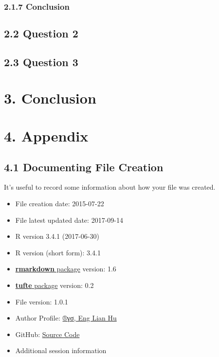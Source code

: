 \documentclass[]{tufte-book}
\providecommand{\tightlist}{%
  \setlength{\itemsep}{0pt}\setlength{\parskip}{0pt}}
\begin{document}
\subsection{2.1.7 Conclusion}\label{conclusion}

\section{2.2 Question 2}\label{question-2}

\section{2.3 Question 3}\label{question-3}

\chapter{3. Conclusion}\label{conclusion-1}

\chapter{4. Appendix}\label{appendix}

\section{4.1 Documenting File Creation}\label{documenting-file-creation}

It's useful to record some information about how your file was created.

\begin{itemize}
\tightlist
\item
  File creation date: 2015-07-22
\item
  File latest updated date: 2017-09-14
\item
  R version 3.4.1 (2017-06-30)
\item
  R version (short form): 3.4.1
\item
  \href{https://github.com/rstudio/rmarkdown}{{\textbf{rmarkdown}
  package}} version: 1.6
\item
  \href{https://github.com/rstudio/tufte}{{\textbf{tufte} package}}
  version: 0.2
\item
  File version: 1.0.1
\item
  Author Profile:
  \href{https://beta.rstudioconnect.com/englianhu/ryo-eng/}{{®γσ, Eng
  Lian Hu}}
\item
  GitHub:
  \href{https://github.com/scibrokes/betting-strategy-and-model-validation}{{Source
  Code}}
\item
  Additional session information
\end{itemize}
\end{document}
